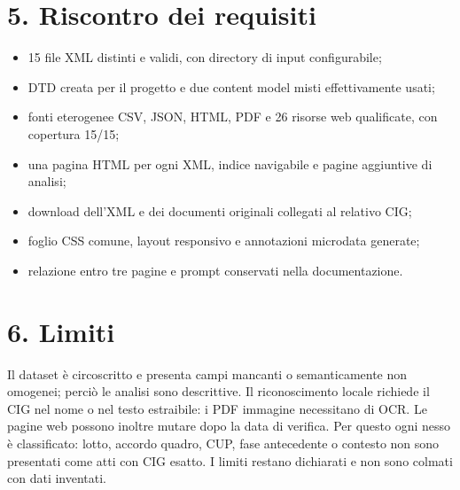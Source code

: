 \documentclass[10pt,a4paper]{article}
\begin{document}
\section*{5. Riscontro dei requisiti}
\begin{itemize}
  \item 15 file XML distinti e validi, con directory di input configurabile;
  \item DTD creata per il progetto e due content model misti effettivamente usati;
  \item fonti eterogenee CSV, JSON, HTML, PDF e 26 risorse web qualificate, con copertura 15/15;
  \item una pagina HTML per ogni XML, indice navigabile e pagine aggiuntive di analisi;
  \item download dell'XML e dei documenti originali collegati al relativo CIG;
  \item foglio CSS comune, layout responsivo e annotazioni microdata generate;
  \item relazione entro tre pagine e prompt conservati nella documentazione.
\end{itemize}

\section*{6. Limiti}
Il dataset è circoscritto e presenta campi mancanti o semanticamente non omogenei; perciò le analisi sono descrittive. Il riconoscimento locale richiede il CIG nel nome o nel testo estraibile: i PDF immagine necessitano di OCR. Le pagine web possono inoltre mutare dopo la data di verifica. Per questo ogni nesso è classificato: lotto, accordo quadro, CUP, fase antecedente o contesto non sono presentati come atti con CIG esatto. I limiti restano dichiarati e non sono colmati con dati inventati.
\end{document}
